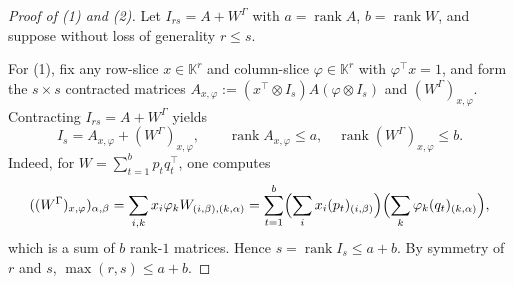 \documentclass[11pt]{article}
\theoremstyle{definition}
\newcommand{\rk}{\operatorname{rank}}
\newcommand{\K}{\mathbb{K}}
\begin{document}
\begin{proof}[Proof of (1) and (2)]
Let $I_{rs} = A + W^\Gamma$ with $a = \rk A$, $b = \rk W$, and suppose without loss of generality $r \le s$.

For (1), fix any row-slice $x \in \K^r$ and column-slice $\varphi \in \K^r$ with $\varphi^\top x = 1$, and form the $s\times s$ contracted matrices $A_{x,\varphi} := (x^\top \otimes I_s) A (\varphi \otimes I_s)$ and $(W^\Gamma)_{x,\varphi}$. Contracting $I_{rs} = A + W^\Gamma$ yields
\[
  I_s = A_{x,\varphi} + (W^\Gamma)_{x,\varphi}, \qquad
  \rk A_{x,\varphi} \le a, \quad \rk(W^\Gamma)_{x,\varphi} \le b.
\]
Indeed, for $W = \sum_{t=1}^b p_t q_t^\top$, one computes
\[
  ((W^\Gamma)_{x,\varphi})_{\alpha,\beta}
  = \sum_{i,k} x_i \varphi_k W_{(i,\beta),(k,\alpha)}
  = \sum_{t=1}^b \Bigl(\sum_i x_i (p_t)_{(i,\beta)}\Bigr)\Bigl(\sum_k \varphi_k (q_t)_{(k,\alpha)}\Bigr),
\]
which is a sum of $b$ rank-$1$ matrices. Hence $s = \rk I_s \le a + b$. By symmetry of $r$ and $s$, $\max(r,s) \le a + b$.


\end{proof}
\end{document}
